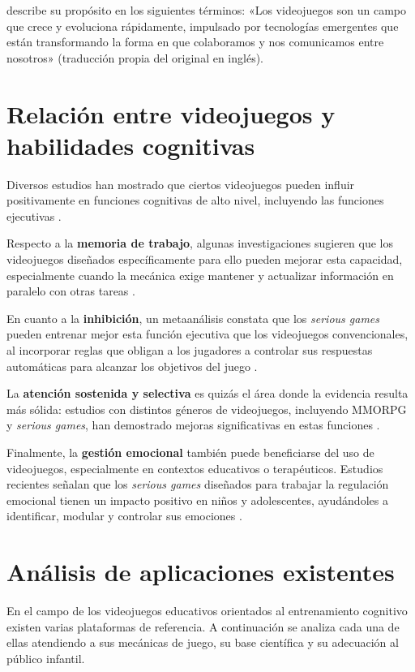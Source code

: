 \documentclass[12pt, a4paper]{report}
\begin{document}
\citet{GamesForChange} describe su propósito en los siguientes términos:
«Los videojuegos son un campo que crece y evoluciona rápidamente, impulsado
por tecnologías emergentes que están transformando la forma en que colaboramos
y nos comunicamos entre nosotros» (traducción propia del original en inglés).

\section{Relación entre videojuegos y habilidades cognitivas}

Diversos estudios han mostrado que ciertos videojuegos pueden influir
positivamente en funciones cognitivas de alto nivel, incluyendo las funciones
ejecutivas \citep{Powers2013,Bediou2018}.

Respecto a la \textbf{memoria de trabajo}, algunas investigaciones sugieren
que los videojuegos diseñados específicamente para ello pueden mejorar esta
capacidad, especialmente cuando la mecánica exige mantener y actualizar
información en paralelo con otras tareas \citep{Anguera2013}.

En cuanto a la \textbf{inhibición}, un metaanálisis constata que los
\textit{serious games} pueden entrenar mejor esta función ejecutiva que los
videojuegos convencionales, al incorporar reglas que obligan a los jugadores
a controlar sus respuestas automáticas para alcanzar los objetivos del juego
\citep{Powers2013}.

La \textbf{atención sostenida y selectiva} es quizás el área donde la evidencia
resulta más sólida: estudios con distintos géneros de videojuegos, incluyendo
MMORPG y \textit{serious games}, han demostrado mejoras significativas en estas
funciones \citep{GreenBavelier2003,Bediou2018}.

Finalmente, la \textbf{gestión emocional} también puede beneficiarse del uso de
videojuegos, especialmente en contextos educativos o terapéuticos. Estudios
recientes señalan que los \textit{serious games} diseñados para trabajar la
regulación emocional tienen un impacto positivo en niños y adolescentes,
ayudándoles a identificar, modular y controlar sus emociones
\citep{Granic2014,UNIR2024}.

\section{Análisis de aplicaciones existentes}

En el campo de los videojuegos educativos orientados al entrenamiento cognitivo
existen varias plataformas de referencia. A continuación se analiza cada una
de ellas atendiendo a sus mecánicas de juego, su base científica y su adecuación
al público infantil.
\end{document}
